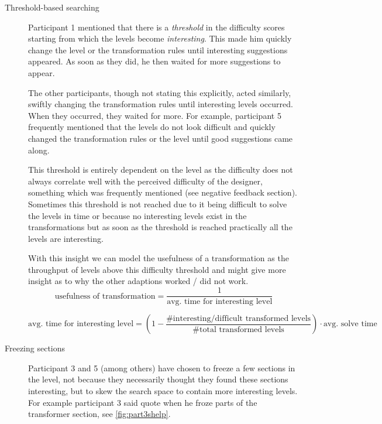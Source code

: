 \begin{description}

    \item[Threshold-based searching] 
Participant 1 mentioned that there is a \textit{threshold} in the difficulty scores starting from which the levels become \textit{interesting}. This made him quickly change the level or the transformation rules until interesting suggestions appeared. As soon as they did, he then waited for more suggestions to appear.

\textit{}

The other participants, though not stating this explicitly, acted similarly, swiftly changing the transformation rules until interesting levels occurred. When they occurred, they waited for more. For example, participant 5 frequently mentioned that the levels do not look difficult and quickly changed the transformation rules or the level until good suggestions came along.

    This threshold is entirely dependent on the level as the difficulty does not always correlate well with the perceived difficulty of the designer, something which was frequently mentioned (see negative feedback section). Sometimes this threshold is not reached due to it being difficult to solve the levels in time or because no interesting levels exist in the transformations but as soon as the threshold is reached practically all the levels are interesting.    

    With this insight we can model the usefulness of a transformation as the throughput of levels above this difficulty threshold and might give more insight as to why the other adaptions worked / did not work.
\begin{equation}
\text{usefulness of transformation} = \frac{1}{\text{avg. time for interesting level}}
\label{eq:transformationusefulness}
\end{equation}
    
\begin{equation}
\text{avg. time for interesting level} = \left(1 - \frac{\text{\# interesting/difficult transformed levels}}{\text{\# total transformed levels}} \right) \cdot \text{avg. solve time}
\label{eq:transformationusefulness}
\end{equation}

    \item[Freezing sections] Participant 3 and 5 (among others) have chosen to freeze a few sections in the level, not because they necessarily thought they found these sections interesting, but to skew the search space to contain more interesting levels. For example participant 3 said quote \textit{} when he froze parts of the transformer section, see \autoref{fig:part3shelp}.
    

\end{description}
